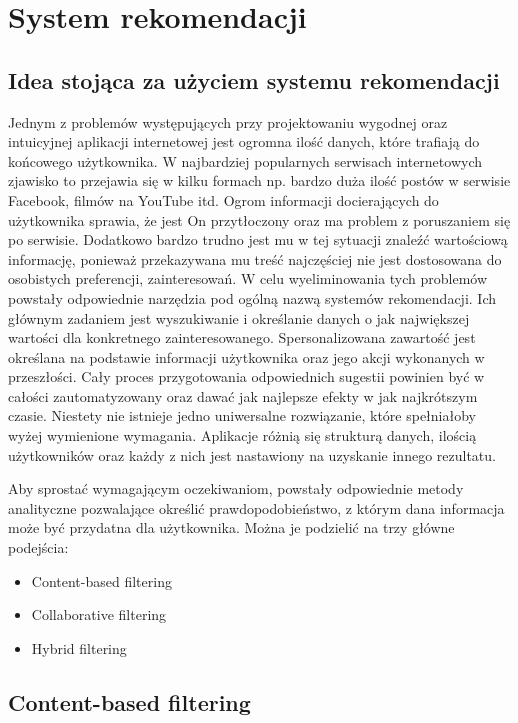 \chapter{System rekomendacji}

\section{Idea stojąca za użyciem systemu rekomendacji}

Jednym z problemów występujących przy projektowaniu wygodnej oraz intuicyjnej aplikacji internetowej jest ogromna ilość danych, które trafiają do końcowego użytkownika. W najbardziej popularnych  serwisach internetowych zjawisko to przejawia się w kilku formach np. bardzo duża ilość postów w serwisie Facebook, filmów na YouTube itd. Ogrom informacji docierających do użytkownika sprawia, że jest On przytłoczony oraz ma problem z poruszaniem się po serwisie. Dodatkowo bardzo trudno jest mu w tej sytuacji znaleźć wartościową informację, ponieważ przekazywana mu treść najczęściej nie jest dostosowana do osobistych preferencji, zainteresowań. W celu wyeliminowania tych problemów powstały odpowiednie narzędzia pod ogólną nazwą systemów rekomendacji. Ich głównym zadaniem jest wyszukiwanie i określanie danych o jak największej wartości dla konkretnego zainteresowanego. Spersonalizowana zawartość jest określana na podstawie informacji użytkownika oraz jego akcji wykonanych w przeszłości. Cały proces przygotowania odpowiednich sugestii powinien być w całości zautomatyzowany oraz dawać jak najlepsze efekty w jak najkrótszym czasie. Niestety nie istnieje jedno uniwersalne rozwiązanie, które spełniałoby wyżej wymienione wymagania. Aplikacje różnią się strukturą danych, ilością użytkowników oraz każdy z nich jest nastawiony na uzyskanie innego rezultatu.


Aby sprostać wymagającym oczekiwaniom, powstały odpowiednie metody analityczne pozwalające określić prawdopodobieństwo, z którym dana informacja może być przydatna dla użytkownika. Można je podzielić na trzy główne podejścia:

\begin{itemize}
	\item Content-based filtering
	\item Collaborative filtering
	\item Hybrid filtering
\end{itemize}

\newpage


\section{Content-based filtering}

